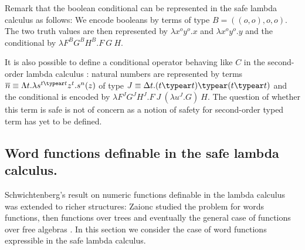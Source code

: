 Remark that the boolean conditional can be represented in the safe
lambda calculus as follows: We encode booleans by terms of type
$B=((o,o),o,o)$. The two truth values are then represented by
$\lambda x^o y^o.x$ and $\lambda x^o y^o.y$ and the conditional by
$\lambda F^B G^B H^B . F~G~H$.

It is also possible to define a conditional operator behaving like
$C$ in the second-order lambda calculus
\cite{DBLP:journals/jacm/FortuneLO83}: natural numbers are
represented by terms $\overline{n} \equiv \Lambda t.\lambda
s^{t\typear t} z^t.s^n(z)$ of type $J \equiv \Delta t.(t\typear t)
\typear (t \typear t)$ and the conditional is encoded by $\lambda
F^J G^J H^J.F~J~(\lambda u^J . G)~H$. The question of whether this
term is safe is not of concern as a notion of safety for
second-order typed term has yet to be defined.






\newcommand{\zaioncencode}{\underline} %

\newcommand{\zaiwordtyp}{\mathbf{B}} %
\newcommand{\closedof}[1]{{\rm Cl}(#1)} %

\newcommand{\openedof}[2]{{\rm Op}(#1,#2)} %

\newcommand\wordnum[1]{\mathbf{#1}} %
\newcommand\safedefset{$\lambda^{safe}${\rm def}}

\newcommand\fatlambda{\lambda\kern-0.7em\lambda}
\newcommand\wordapp{{\sf app}}
\newcommand\wordsub{{\sf sub}}


\subsection{Word functions definable in the safe lambda calculus.}
Schwichtenberg's result on numeric functions definable in the lambda
calculus was extended to richer structures: Zaionc studied the
problem for words functions, then functions over trees and
eventually the general case of functions over free algebras
\cite{DBLP:journals/tcs/Leivant93,DBLP:journals/apal/Zaionc91,702481,DBLP:journals/tcs/Zaionc87,
zaionc:csl94}. In this section we consider the case of word
functions expressible in the safe lambda calculus.
\smallskip

